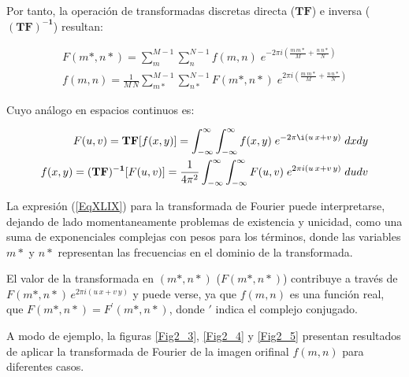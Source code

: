 Por tanto, la operaci\'on de transformadas discretas directa ($\mathbf{TF}$) e inversa ($\mathbf{(TF)^{-1}}$) resultan:

\begin{eqnarray}
	F(m*, n*) = \sum _{m} ^{M-1} \sum _{n} ^{N-1} f(m, n) \; e^{-2 \pi i \left( \frac{m \, m*}{M} + \frac{n \, n*}{N}\right)} \nonumber \\
	f(m, n) = \frac{1}{M \, N} \sum _{m*} ^{M-1} \sum _{n*} ^{N-1} F(m*, n*) \; e^{2 \pi i \left( \frac{m \, m*}{M} + \frac{n \, n*}{N}\right)}
\label{EqXLVIII}
\end{eqnarray}

Cuyo an\'alogo en espacios continuos es:

\begin{eqnarray}
	F(u, v) = \mathbf{TF}[f(x, y)] = \int_{-\infty}^{\infty} \int_{-\infty}^{\infty} f(x, y) \; e^{-2 \pi \i (u \, x + v \, y)} \; dx dy \nonumber \\
	f(x, y) = \mathbf{(TF)^{-1}}[F(u, v)] = \frac{1}{4 \pi^{2}} \int_{-\infty}^{\infty} \int_{-\infty}^{\infty} F(u, v) \;
	e^{2 \pi i (u \, x + v \, y)} \; du dv
\label{EqLI}
\end{eqnarray}



La expresi\'on (\ref{EqXLIX}) para la transformada de Fourier puede interpretarse, dejando de lado momentaneamente problemas de existencia y unicidad, como
una suma de exponenciales complejas con pesos para los t\'erminos, donde las variables $m*$ y $n*$ representan las frecuencias en el dominio de la
transformada.
%

%
El valor de la transformada en $(m*, n*)$ ($F(m*, n*)$) contribuye a trav\'es de $F(m*, n*) \, e^{2 \pi i (u \, x + v \, y)}$ y puede verse, ya que $f(m, n)$
es una funci\'on real, que $F(m*, n*) = F^{\prime} (m*, n*)$, donde $\prime$ indica el complejo conjugado.
%

%
A modo de ejemplo, la figuras \ref{Fig2_3}, \ref{Fig2_4} y  \ref{Fig2_5} presentan resultados de aplicar la transformada de Fourier de la imagen 
orifinal $f(m, n)$ para diferentes casos.

\vspace{1.0cm}


